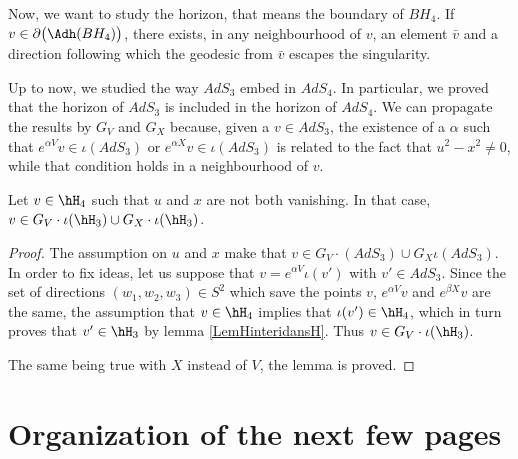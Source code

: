 Now, we want to study the horizon, that means the boundary of $BH_4$. If $v\in\partial\big(\Adh(BH_4) \big)$, there exists, in any neighbourhood of $v$, an element $\bar v$ and a direction following which the geodesic from $\bar v$ escapes the singularity.

Up to now, we studied the way $AdS_3$ embed in $AdS_4$. In particular, we proved that the horizon of $AdS_3$ is included in the horizon of $AdS_4$. We can propagate the results by $G_V$ and $G_X$ because, given a $v\in AdS_3$, the existence of a $\alpha$ such that $ e^{\alpha V}v\in\iota(AdS_3)$ or $ e^{\alpha X}v\in\iota(AdS_3)$ is related to the fact that $u^2-x^2\neq 0$, while that condition holds in a neighbourhood of $v$. 

\begin{lemma}		\label{LemPresqueHOrQadp}
Let $v\in\hH_4$ such that $u$ and $x$ are not both vanishing. In that case, $v\in G_V\cdot \iota(\hH_3)\cup G_X\cdot\iota(\hH_3)$.
\end{lemma}

\begin{proof}
The assumption on $u$ and $x$ make that $v\in G_V\cdot(AdS_3)\cup G_X\iota(AdS_3)$. In order to fix ideas, let us suppose that $v= e^{\alpha V}\iota(v')$ with $v'\in AdS_3$. Since the set of directions $(w_1,w_2,w_3)\in S^2$ which save the points $v$, $ e^{\alpha V}v$ and $ e^{\beta X}v$ are the same, the assumption that $v\in\hH_4$ implies that $\iota(v')\in \hH_4$, which in turn proves that $v'\in \hH_3$ by lemma \ref{LemHinteridansH}. Thus $v\in G_V\cdot\iota(\hH_3)$.

The same being true with $X$ instead of $V$, the lemma is proved.
\end{proof}

\section{Organization of the next few pages}

